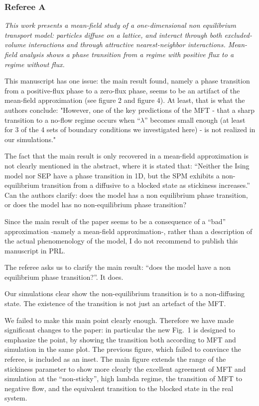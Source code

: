 \documentclass[a4paper,10pt]{article}
\begin{document}
   \subsubsection*{Referee A}
  
   {\it This work presents a mean-field study of a one-dimensional non
   equilibrium transport model: particles diffuse on a lattice, and
   interact through both excluded-volume interactions and through
   attractive nearest-neighbor interactions. Mean-field analysis shows a
   phase transition from a regime with positive flux to a regime without
   flux.
  
   This manuscript has one issue: the main result found, namely a phase
   transition from a positive-flux phase to a zero-flux phase, seems to
   be an artifact of the mean-field approximation (see figure 2 and
   figure 4). At least, that is what the authors conclude: "However, one
   of the key predictions of the MFT - that a sharp transition to a
   no-flow regime occurs when ``$\lambda$'' becomes small enough (at least
   for 3 of the 4 sets of boundary conditions we investigated here) - is
   not realized in our simulations."
  
   The fact that the main result is only recovered in a mean-field
   approximation is not clearly mentioned in the abstract, where it is
   stated that: ``Neither the Ising model nor SEP have a phase transition
   in 1D, but the SPM exhibits a non-equilibrium transition from a
   diffusive to a blocked state as stickiness increases.'' Can the authors
   clarify: does the model has a non equilibrium phase transition, or
   does the model has no non-equilibrium phase transition?
  
   Since the main result of the paper seems to be a consequence of a
   ``bad'' approximation -namely a mean-field approximation-, rather
   than a description of the actual phenomenology of the model, I do not
   recommend to publish this manuscript in PRL.}




  The referee asks us to clarify the main result: ``does the model have a non equilibrium phase transition?''. 
  It does.
 
  Our simulations clear show the non-equilibrium transition is to a
  non-diffusing state.  The existence of the transition is not just an
  artefact of the MFT.
 
  We failed to make this main point clearly enough.
  Therefore we have made significant changes to the paper: in particular the
  new Fig.~1 is designed to emphasize the point, by showing the
  transition both according to MFT and simulation in the same plot.
  The previous figure, which failed to convince the referee, is
  included as an inset.  The main figure extends the range of the
  stickiness parameter to show more clearly the excellent agreement of
  MFT and simulation at the ``non-sticky'', high lambda regime, the
  transition of MFT to negative flow, and the equivalent transition to
  the blocked state in the real system.
 
\end{document}

